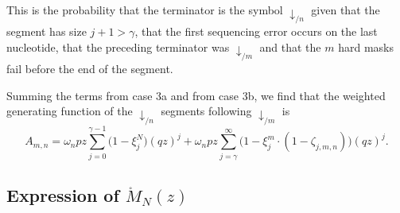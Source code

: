 \documentclass{article}
\begin{document}
This is the probability that the terminator is the symbol
$\downarrow_{/n}$ given that the segment has size $j+1 > \gamma$, that
the first sequencing error occurs on the last nucleotide, that the
preceding terminator was $\downarrow_{/m}$ and that the $m$ hard masks
fail before the end of the segment.

Summing the terms from case 3a and from case 3b, we find that the weighted
generating function of the $\downarrow_{/n}$ segments following
$\downarrow_{/m}$ is
\begin{equation}
\label{eq:A}
A_{m,n} =
\omega_n pz \sum_{j=0}^{\gamma-1} \Big(1 - \xi_j^N \Big) (qz)^j + \omega_n
pz \sum_{j=\gamma}^\infty \Big(1 - \xi_j^m \cdot
(1- \zeta_{j,m,n}) \Big) (qz)^j.
\end{equation}

\subsection{Expression of $\mathring{M}_N(z)$}
\label{sec:expression_of_M}
\end{document}
